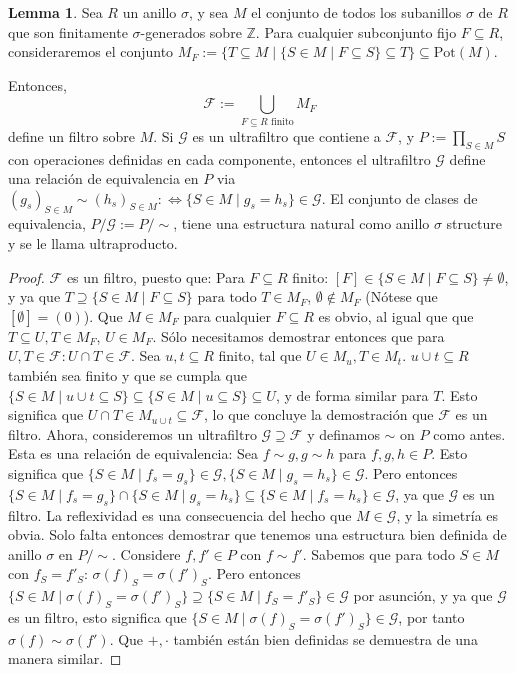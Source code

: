 \documentclass[12pt,a4paper,BCOR15mm,twoside,DIV12]{article}
\def\Z{\mathbb{Z}}
\def\fa{\text{ para todo }}
\def\s{\sigma}
\theoremstyle{definition}
\newtheorem{lem}[Satz]{Lemma}
\begin{document}
\begin{lem}\label{lemmafilters}
Sea $R$ un anillo $\s$, y sea $M$ el conjunto de todos los subanillos $\s$ de $R$ que son finitamente $\s$-generados sobre $\Z$. Para cualquier subconjunto fijo $F \subseteq R$, consideraremos el conjunto $M_F:= \{ T \subseteq M \mid \{S \in M \mid F \subseteq S \} \subseteq T \} \subseteq \text{Pot}(M)$. 

Entonces, \[ \mathcal{F}:= \bigcup_{ F \subseteq R \text{ finito} } M_F \]
 define un filtro sobre $M$. Si $\mathcal{G}$ es un ultrafiltro que contiene a $\mathcal{F}$, y $P:= \prod_{S \in M} S$ con operaciones definidas en cada componente,
 entonces el ultrafiltro $\mathcal{G}$ define una relación de equivalencia en $P$ via $(g_s)_{S \in M} \sim (h_s)_{S \in M} : \Leftrightarrow \{ S \in M \mid g_s = h_s \} \in \mathcal{G}$. 
El conjunto de clases de equivalencia, $P/\mathcal{G}:= P/\sim$, tiene una estructura natural como anillo $\s$ structure y se le llama ultraproducto. %
\begin{proof}
$\mathcal{F}$ es un filtro, puesto que:
  Para $F \subseteq R$ finito: $[F] \in \{ S \in M \mid F \subseteq S \} \neq \emptyset$, y ya que $T \supseteq \{ S \in M \mid F \subseteq S \} \fa T \in M_F$, $\emptyset \notin M_F$ (Nótese que $[\emptyset] = (0)$).
  Que $M \in M_F$ para cualquier $F \subseteq R$ es obvio, al igual que que $T \subseteq U, T \in M_F$, $U \in M_F$. Sólo necesitamos demostrar entonces que para $U,T \in \mathcal{F}: U \cap T \in \mathcal{F}$.
  Sea $u, t \subseteq R$ finito, tal que $U \in M_u, T \in M_t$. $u \cup t \subseteq R$ también sea finito y que se cumpla que $\{ S \in M \mid u \cup t \subseteq S \} \subseteq \{ S \in M \mid u \subseteq S \} \subseteq U$,
 y de forma similar para $T$. Esto significa que $U \cap T \in M_{u \cup t} \subseteq \mathcal{F}$, lo que concluye la demostración que $\mathcal{F}$ es un filtro.
 Ahora, consideremos un ultrafiltro $\mathcal{G} \supseteq \mathcal{F}$ y definamos $\sim$ on $P$ como antes. Esta es una relación de equivalencia: Sea $f \sim g, g \sim h$ para $f,g,h \in P$. 
 Esto significa que  $\{ S \in M \mid f_s = g_s \} \in \mathcal{G}, \{ S \in M \mid g_s = h_s \} \in \mathcal{G}$. Pero entonces $\{ S \in M \mid f_s = g_s \} \cap \{ S \in M \mid g_s = h_s \} \subseteq \{ S \in M \mid f_s = h_s \} \in \mathcal{G}$, ya que  $\mathcal{G}$ es un filtro.
 La reflexividad es una consecuencia del hecho que $M \in \mathcal{G}$, y la simetría es obvia. Solo falta entonces demostrar que tenemos una estructura bien definida de anillo $\s$ en $P/ \sim$.
 Considere $f,f' \in P$ con $f \sim f'$. Sabemos que para todo $S \in M$ con $f_S = f'_S$:  $\sigma(f)_S = \sigma(f')_S$. 
 Pero entonces $\{ S \in M \mid \s(f)_S = \s(f')_S \} \supseteq \{ S \in M \mid f_S = f'_S \} \in \mathcal{G}$ por asunción, y ya que $\mathcal{G}$ es un filtro, esto significa que $\{ S \in M \mid \s(f)_S = \s(f')_S \} \in \mathcal{G}$,
 por tanto $\s(f) \sim \s(f')$. Que $+, \cdot$ también están bien definidas se demuestra de una manera similar.
\end{proof}
\end{lem}
\end{document}
